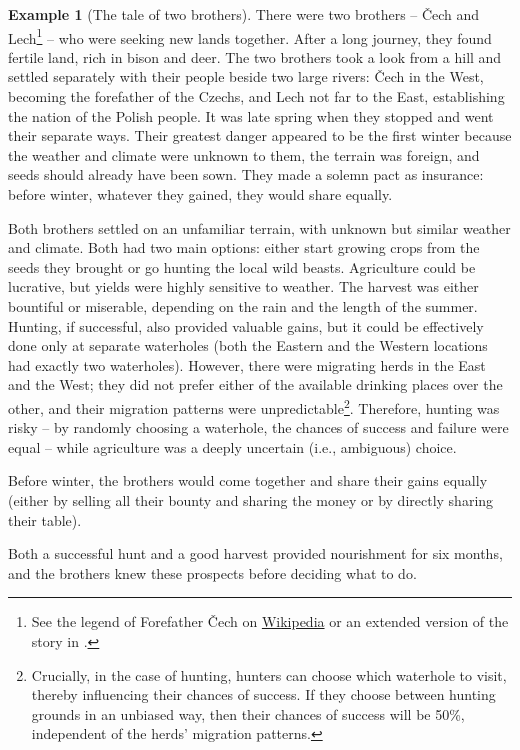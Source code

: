 \documentclass{article}
\theoremstyle{definition}
\newtheorem*{example}{Example}
\begin{document}
\begin{example}[The tale of two brothers]
There were two brothers -- Čech and Lech\footnote{See the legend of Forefather Čech on \href{https://en.wikipedia.org/wiki/Ancient_Bohemian_Legends\#Forefather_\%C4\%8Cech}{Wikipedia} or an extended version of the story in \cite{LegendsOfOldBohemia63}.} -- who were seeking new lands together.
After a long journey, they found fertile land, rich in bison and deer.
The two brothers took a look from a hill and settled separately with their people beside two large rivers: Čech in the West, becoming the forefather of the Czechs, and Lech not far to the East, establishing the nation of the Polish people.
It was late spring when they stopped and went their separate ways. Their greatest danger appeared to be the first winter because the weather and climate were unknown to them, the terrain was foreign, and seeds should already have been sown.
They made a solemn pact as insurance: before winter, whatever they gained, they would share equally.

Both brothers settled on an unfamiliar terrain, with unknown but similar weather and climate. Both had two main options: either start growing crops from the seeds they brought or go hunting the local wild beasts.
Agriculture could be lucrative, but yields were highly sensitive to weather. The harvest was either bountiful or miserable, depending on the rain and the length of the summer.
Hunting, if successful, also provided valuable gains, but it could be effectively done only at separate waterholes (both the Eastern and the Western locations had exactly two waterholes). However, there were migrating herds in the East and the West; they did not prefer either of the available drinking places over the other, and their migration patterns were unpredictable\footnote{Crucially, in the case of hunting, hunters can choose which waterhole to visit, thereby influencing their chances of success. If they choose between hunting grounds in an unbiased way, then their chances of success will be 50\%, independent of the herds’ migration patterns.}. Therefore, hunting was risky -- by randomly choosing a waterhole, the chances of success and failure were equal -- while agriculture was a deeply uncertain (i.e., ambiguous) choice.

Before winter, the brothers would come together and share their gains equally (either by selling all their bounty and sharing the money or by directly sharing their table).

Both a successful hunt and a good harvest provided nourishment for six months, and the brothers knew these prospects before deciding what to do.


\end{example}
\end{document}
